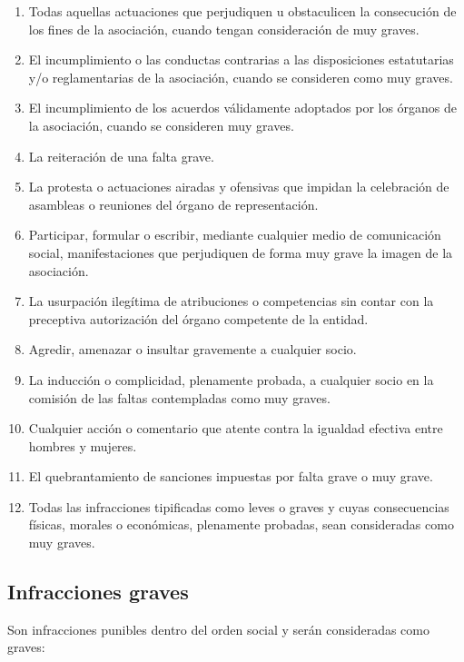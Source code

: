 \documentclass[a4paper, 12pt, oneside]{book}
\begin{document}
\begin{enumerate}
    \item Todas aquellas actuaciones que perjudiquen u obstaculicen la consecución de los fines de la asociación, cuando tengan consideración de muy graves.  
    \item El incumplimiento o las conductas contrarias a las disposiciones estatutarias y/o reglamentarias de la asociación, cuando se consideren como muy graves.  
    \item El incumplimiento de los acuerdos válidamente adoptados por los órganos de la asociación, cuando se consideren muy graves.  
    \item La reiteración de una falta grave.  
    \item La protesta o actuaciones airadas y ofensivas que impidan la celebración de asambleas o reuniones del órgano de representación.  
    \item Participar, formular o escribir, mediante cualquier medio de comunicación social, manifestaciones que perjudiquen de forma muy grave la imagen de la asociación.  
    \item La usurpación ilegítima de atribuciones o competencias sin contar con la preceptiva autorización del órgano competente de la entidad.  
    \item Agredir, amenazar o insultar gravemente a cualquier socio.  
    \item La inducción o complicidad, plenamente probada, a cualquier socio en la comisión de las faltas contempladas como muy graves.  
    \item Cualquier acción o comentario que atente contra la igualdad efectiva entre hombres y mujeres.  
    \item El quebrantamiento de sanciones impuestas por falta grave o muy grave.  
    \item Todas las infracciones tipificadas como leves o graves y cuyas consecuencias físicas, morales o económicas, plenamente probadas, sean consideradas como muy graves.
\end{enumerate}

\subsection{Infracciones graves}

Son infracciones punibles dentro del orden social y serán consideradas como graves:
\end{document}
